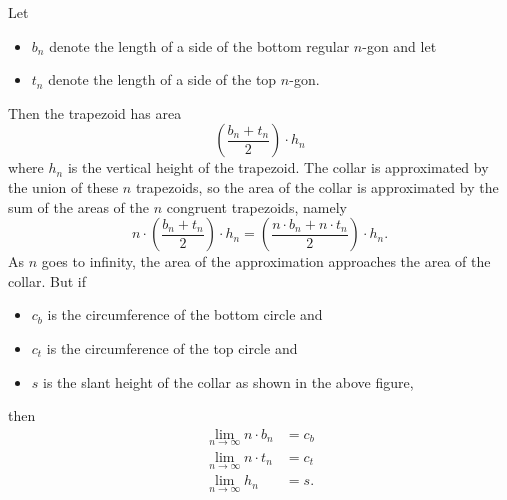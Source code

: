 \documentclass[newpage,hints,handout,noauthor,nooutcomes,12pt]{ximera}
\begin{document}
Let
\begin{itemize}
\item $b_{n}$ denote the length of a side of the bottom regular
  $n$-gon and let
\item $t_{n}$ denote the length of a side of the top $n$-gon. 
\end{itemize}
\begin{image}
\end{image}
Then the trapezoid has area
\[
\left(  \frac{b_{n}+t_{n}}{2}\right)  \cdot h_{n}%
\]
where $h_{n}$ is the vertical height of the trapezoid. The collar is
approximated by the union of these $n$ trapezoids, so the area of the collar
is approximated by the sum of the areas of the $n$ congruent trapezoids,
namely%
\[
n\cdot \left(  \frac{b_{n}+t_{n}}{2}\right)
\cdot h_{n}=\left(  \frac{n\cdot %
b_{n}+n\cdot t_{n}}{2}\right) \cdot h_{n}.
\]
As $n$ goes to infinity, the area of the approximation approaches the area of
the collar. But if 
\begin{itemize}
\item $c_{b}$ is the circumference of the bottom circle and 
\item $c_{t}$ is the circumference of the top circle and 
\item $s$ is the slant height of the collar as shown in the above
  figure,
\end{itemize}
then
\begin{align*}
\lim_{n\to \infty} n\cdot b_{n}  &  =c_{b}\\
\lim_{n\to \infty} n \cdot t_{n}  &  =c_{t}\\
\lim_{n\to \infty} h_{n}  &  =s.
\end{align*}
\end{document}
